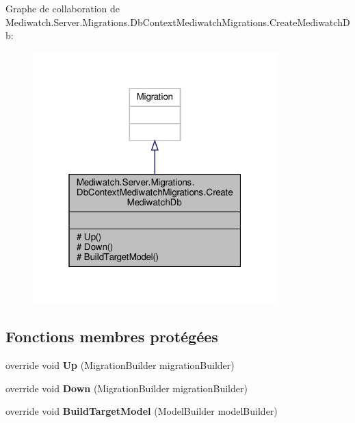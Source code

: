 Graphe de collaboration de Mediwatch.\+Server.\+Migrations.\+Db\+Context\+Mediwatch\+Migrations.\+Create\+Mediwatch\+Db\+:
\nopagebreak
\begin{figure}[H]
\begin{center}
\leavevmode
\includegraphics[width=268pt]{class_mediwatch_1_1_server_1_1_migrations_1_1_db_context_mediwatch_migrations_1_1_create_mediwatch_db__coll__graph}
\end{center}
\end{figure}
\subsection*{Fonctions membres protégées}
\begin{DoxyCompactItemize}
\item 
\mbox{\label{class_mediwatch_1_1_server_1_1_migrations_1_1_db_context_mediwatch_migrations_1_1_create_mediwatch_db_aea17f6e8d7935f5a0bfb038903fec64a}} 
override void {\bfseries Up} (Migration\+Builder migration\+Builder)
\item 
\mbox{\label{class_mediwatch_1_1_server_1_1_migrations_1_1_db_context_mediwatch_migrations_1_1_create_mediwatch_db_a055a6d2d32482bd9266d1027a621c37d}} 
override void {\bfseries Down} (Migration\+Builder migration\+Builder)
\item 
\mbox{\label{class_mediwatch_1_1_server_1_1_migrations_1_1_db_context_mediwatch_migrations_1_1_create_mediwatch_db_a57e6a29d0df03daabc564d7e74d20dc2}} 
override void {\bfseries Build\+Target\+Model} (Model\+Builder model\+Builder)
\end{DoxyCompactItemize}


